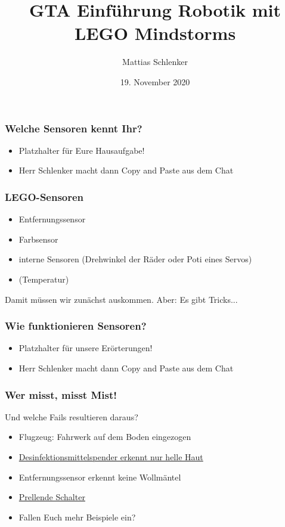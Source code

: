 \documentclass{beamer}
\title{GTA Einführung Robotik mit LEGO Mindstorms}
\author{Mattias Schlenker}
\institute{Wilhelm-Ostwald-Gymnasium}
\date{19. November 2020}
\begin{document}
\frame{\titlepage}

\begin{frame}
\frametitle{Welche Sensoren kennt Ihr?}
\begin{itemize}
\item Platzhalter für Eure Hausaufgabe!
\item Herr Schlenker macht dann Copy and Paste aus dem Chat
\end{itemize}
\end{frame}


\begin{frame}
\frametitle{LEGO-Sensoren}
\begin{itemize}
\item  Entfernungssensor
\item  Farbsensor
\item  interne Sensoren (Drehwinkel der Räder oder Poti eines Servos)
\item (Temperatur)
\end{itemize}

Damit müssen wir zunächst auskommen. Aber: Es gibt Tricks...

\end{frame}
 
 
\begin{frame}
\frametitle{Wie funktionieren Sensoren?}
\begin{itemize}
\item Platzhalter für unsere Erörterungen!
\item Herr Schlenker macht dann Copy and Paste aus dem Chat
\end{itemize}
\end{frame}


\begin{frame}
\frametitle{Wer misst, misst Mist!}
Und welche Fails resultieren daraus?
\begin{itemize}
\item Flugzeug: Fahrwerk auf dem Boden eingezogen
\item \href{https://twitter.com/nke_ise/status/897756900753891328}{Desinfektionsmittelspender erkennt nur helle Haut}
\item Entfernungssensor erkennt keine Wollmäntel
\item \href{https://youtu.be/jI-rC2FCKo4?t=94}{Prellende Schalter}
\item Fallen Euch mehr Beispiele ein?
\end{itemize}
\end{frame}
\end{document}
